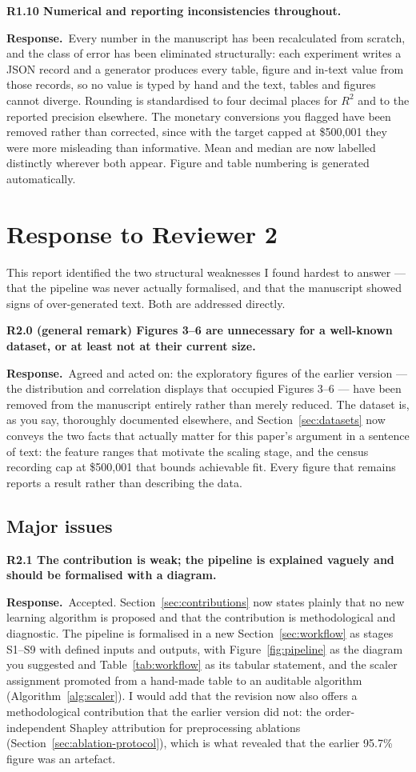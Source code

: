 \documentclass[11pt,a4paper]{article}
\newcommand{\reply}{\par\noindent\textbf{Response.}\ }
\newcommand{\pt}[1]{\par\medskip\noindent\textbf{#1}\par}
\begin{document}
\pt{R1.10 Numerical and reporting inconsistencies throughout.}
\reply Every number in the manuscript has been recalculated from scratch, and the class of
error has been eliminated structurally: each experiment writes a JSON record and a generator
produces every table, figure and in-text value from those records, so no value is typed by
hand and the text, tables and figures cannot diverge. Rounding is standardised to four
decimal places for $R^2$ and to the reported precision elsewhere. The monetary conversions
you flagged have been removed rather than corrected, since with the target capped at
\$500{,}001 they were more misleading than informative. Mean and median are now labelled
distinctly wherever both appear. Figure and table numbering is generated automatically.

\section{Response to Reviewer 2}

This report identified the two structural weaknesses I found hardest to answer --- that the
pipeline was never actually formalised, and that the manuscript showed signs of
over-generated text. Both are addressed directly.

\pt{R2.0 (general remark) Figures 3--6 are unnecessary for a well-known dataset, or at
least not at their current size.}
\reply Agreed and acted on: the exploratory figures of the earlier version --- the
distribution and correlation displays that occupied Figures 3--6 --- have been removed from
the manuscript entirely rather than merely reduced. The dataset is, as you say, thoroughly
documented elsewhere, and Section~\ref{sec:datasets} now conveys the two facts that actually
matter for this paper's argument in a sentence of text: the feature ranges that motivate the
scaling stage, and the census recording cap at \$500{,}001 that bounds achievable fit. Every
figure that remains reports a result rather than describing the data.

\subsection*{Major issues}

\pt{R2.1 The contribution is weak; the pipeline is explained vaguely and should be
formalised with a diagram.}
\reply Accepted. Section~\ref{sec:contributions} now states plainly that no new learning algorithm is proposed
and that the contribution is methodological and diagnostic. The pipeline is formalised in a
new Section~\ref{sec:workflow} as stages S1--S9 with defined inputs and outputs, with Figure~\ref{fig:pipeline} as the diagram
you suggested and Table~\ref{tab:workflow} as its tabular statement, and the scaler assignment promoted from a
hand-made table to an auditable algorithm (Algorithm~\ref{alg:scaler}). I would add that the revision now
also offers a methodological contribution that the earlier version did not: the
order-independent Shapley attribution for preprocessing ablations (Section~\ref{sec:ablation-protocol}), which is
what revealed that the earlier 95.7\% figure was an artefact.
\end{document}
